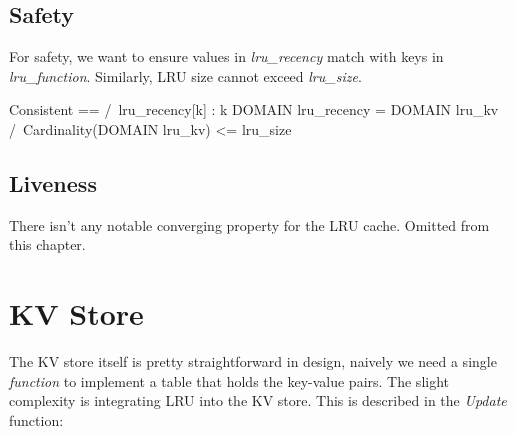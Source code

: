 \subsection{Safety}

For safety, we want to ensure values in \textit{lru\_recency} match with keys
in \textit{lru\_function}. Similarly, LRU size cannot exceed \textit{lru\_size}.\\

\begin{tla}
    Consistent ==
    /\ {lru_recency[k] : k \in DOMAIN lru_recency} = DOMAIN lru_kv
    /\ Cardinality(DOMAIN lru_kv) <= lru_size
\end{tla}
\begin{tlatex}
%
%
\end{tlatex}

\subsection{Liveness}

There isn't any notable converging property for the LRU cache. Omitted from this chapter. 

\section{KV Store}

The KV store itself is pretty straightforward in design, naively we need a single 
\textit{function} to implement a table that holds the key-value pairs. The slight complexity 
is integrating LRU into the KV store. This is described in the \textit{Update} function:

